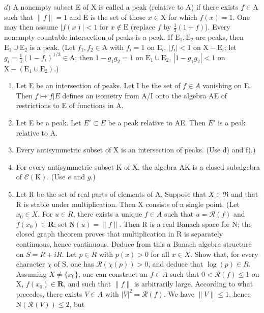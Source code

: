 \(d)\) A nonempty subset E of X is called a peak (relative to A) if there exists \(f\in \mathrm{A}\) such that \(\| f\| = 1\) and E is the set of those \(x\in \mathrm{X}\) for which \(f(x) = 1\). One may then assume \(|f(x)| < 1\) for \(x\notin \mathrm{E}\) (replace \(f\) by \(\frac{1}{2} (1 + f)\)). Every nonempty countable intersection of peaks is a peak. If \(\mathrm{E}_1,\mathrm{E}_2\) are peaks, then \(\mathrm{E}_1\cup \mathrm{E}_2\) is a peak. (Let \(f_{1},f_{2}\in \mathrm{A}\) with \(f_{i} = 1\) on \(\mathrm{E}_i\), \(|f_i| < 1\) on \(\mathrm{X - E}_i\); let \(g_{i} = \frac{1}{4} (1 - f_{i})^{1 / 3}\in \mathrm{A}\); then \(1 - g_{1}g_{2} = 1\) on \(\mathrm{E}_1\cup \mathrm{E}_2\), \(|1 - g_1g_2| < 1\) on \(\mathrm{X - (E_1\cup E_2)}\).)

\begin{enumerate}
\def\labelenumi{\alph{enumi})}
\setcounter{enumi}{4}
\item
  Let E be an intersection of peaks. Let I be the set of \(f \in A\) vanishing on E. Then \(f \mapsto f|E\) defines an isometry from A/I onto the algebra A\textbar E of restrictions to E of functions in A.
\item
  Let E be a peak. Let \(E' \subset E\) be a peak relative to A\textbar E. Then \(E'\) is a peak relative to A.
\item
  Every antisymmetric subset of X is an intersection of peaks. (Use d) and f).)
\item
  For every antisymmetric subset K of X, the algebra A\textbar K is a closed subalgebra of \(\mathcal{C}(\mathrm{K})\). (Use \(e\) and \(g\).)
\item
  Let R be the set of real parts of elements of A. Suppose that \(X \in \mathfrak{R}\) and that R is stable under multiplication. Then X consists of a single point. (Let \(x_{0} \in X\). For \(u \in R\), there exists a unique \(f \in A\) such that \(u = \mathcal{R}(f)\) and \(f(x_{0}) \in \mathbf{R}\); set \(\mathrm{N}(u) = \|f\|\). Then R is a real Banach space for N; the closed graph theorem proves that multiplication in R is separately continuous, hence continuous. Deduce from this a Banach algebra structure on \(S = R + iR\). Let \(p \in R\) with \(p(x) > 0\) for all \(x \in X\). Show that, for every character \(\chi\) of S, one has \(\mathcal{R}(\chi(p)) > 0\), and deduce that \(\log(p) \in R\). Assuming \(X \neq \{x_{0}\}\), one can construct an \(f \in A\) such that \(0 < \mathcal{R}(f) \leqslant 1\) on X, \(f(x_{0}) \in \mathbf{R}\), and such that \(\|f\|\) is arbitrarily large. According to what precedes, there exists \(V \in A\) with \(|V|^{2} = \mathcal{R}(f)\). We have \(\|V\| \leqslant 1\), hence \(\mathrm{N}(\mathcal{R}(V)) \leqslant 2\), but
\end{enumerate}

